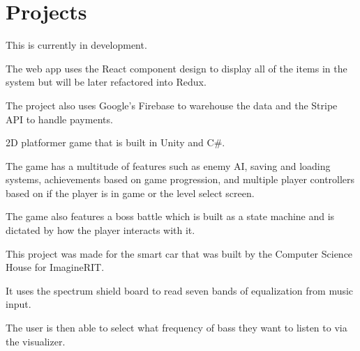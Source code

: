 \documentclass[a4paper]{comcv}
\begin{document}
\vspace{\topsep}


\section{Projects}
\smallskip
\begin{tightlist}
    \item This is currently in development.
    \item The web app uses the React component design to display all of the items in the system but will be later refactored into Redux.
    \item The project also uses Google’s Firebase to warehouse the data and the Stripe API to handle payments.
\end{tightlist}

\smallskip
\begin{tightlist}
    \item 2D platformer game that is built in Unity and C\#.
    \item  The game has a multitude of features such as enemy AI, saving and loading systems, achievements based on game progression, and multiple player controllers based on if the player is in game or the level select screen.
    \item The game also features a boss battle which is built as a state machine and is dictated by how the player interacts with it.
\end{tightlist}


\smallskip
    \begin{tightlist}
        \item This project was made for the smart car that was built by the Computer Science House for ImagineRIT.
        \item  It uses the spectrum shield board to read seven bands of equalization from music input.
        \item The user is then able to select what frequency of bass they want to listen to via the visualizer.
    \end{tightlist}
\end{document}
